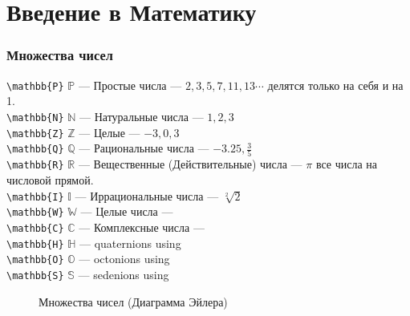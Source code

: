 \documentclass[a4paper, 12 pt]{article}
\begin{document}
\part{Введение в Математику}
\section{Множества чисел}
\begin{flushleft}
	\verb|\mathbb{P}| $\mathbb{P}$ --- Простые числа        --- $2,3,5,7,11,13 \cdots$ делятся только на себя и на 1.\\
	\verb|\mathbb{N}| $\mathbb{N}$ --- Натуральные числа    --- $1, 2, 3$                \\
	\verb|\mathbb{Z}| $\mathbb{Z}$ --- Целые                --- $-3, 0, 3$               \\
	\verb|\mathbb{Q}| $\mathbb{Q}$ --- Рациональные числа   --- $-3.25, \frac{3}{5} $    \\
	\verb|\mathbb{R}| $\mathbb{R}$ --- Вещественные (Действительные) числа   --- $\pi$ все числа на числовой прямой.\\
	\verb|\mathbb{I}| $\mathbb{I}$ --- Иррациональные числа --- $\sqrt[2]{2}$						 \\
	\verb|\mathbb{W}| $\mathbb{W}$ --- Целые числа          ---                          \\
	\verb|\mathbb{C}| $\mathbb{C}$ --- Комплексные числа    ---             \\

	\verb|\mathbb{H}| $\mathbb{H}$ --- quaternions using     \\
	\verb|\mathbb{O}| $\mathbb{O}$ --- octonions using       \\
	\verb|\mathbb{S}| $\mathbb{S}$ --- sedenions using       \\
\end{flushleft}

\begin{figure}[H]
	\centering
	\caption{Множества чисел (Диаграмма Эйлера)}\label{fig:sets_of_numbers}
\end{figure}
\end{document}
